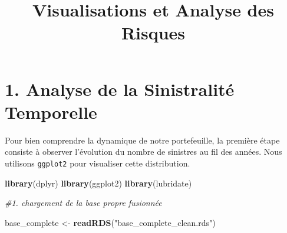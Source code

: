 \documentclass[
]{article}
\title{Visualisations et Analyse des Risques}
\author{}
\date{\vspace{-2.5em}}
\newenvironment{Shaded}{\begin{snugshade}}{\end{snugshade}}
\newcommand{\CommentTok}[1]{\textcolor[rgb]{0.56,0.35,0.01}{\textit{#1}}}
\newcommand{\FunctionTok}[1]{\textcolor[rgb]{0.13,0.29,0.53}{\textbf{#1}}}
\newcommand{\NormalTok}[1]{#1}
\newcommand{\OtherTok}[1]{\textcolor[rgb]{0.56,0.35,0.01}{#1}}
\newcommand{\StringTok}[1]{\textcolor[rgb]{0.31,0.60,0.02}{#1}}
\begin{document}
\maketitle

\section{1. Analyse de la Sinistralité
Temporelle}\label{analyse-de-la-sinistralituxe9-temporelle}

Pour bien comprendre la dynamique de notre portefeuille, la première
étape consiste à observer l'évolution du nombre de sinistres au fil des
années. Nous utilisons \texttt{ggplot2} pour visualiser cette
distribution.

\begin{Shaded}
\begin{Highlighting}[]
\FunctionTok{library}\NormalTok{(dplyr)}
\FunctionTok{library}\NormalTok{(ggplot2)}
\FunctionTok{library}\NormalTok{(lubridate)}

\CommentTok{\#1. chargement de la base propre fusionnée}

\NormalTok{base\_complete }\OtherTok{\textless{}{-}} \FunctionTok{readRDS}\NormalTok{(}\StringTok{"base\_complete\_clean.rds"}\NormalTok{)}
\end{Highlighting}
\end{Shaded}
\end{document}
